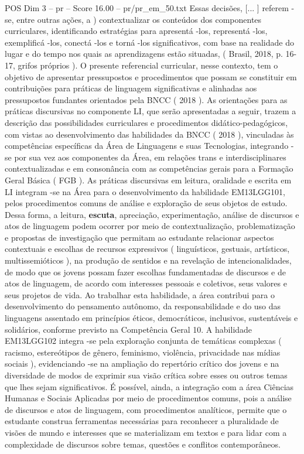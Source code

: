\begin{textsample}{POS Dim 3 – pr – Score 16.00 – pr/pr\_em\_50.txt}
Essas decisões, [... ] referem -se, entre outras ações, a ) contextualizar os conteúdos dos componentes curriculares, identificando estratégias para apresentá -los, representá -los, exemplificá -los, conectá -los e torná -los significativos, com base na realidade do lugar e do tempo nos quais as aprendizagens estão situadas, ( Brasil, 2018, p. 16-17, grifos próprios ).
O presente referencial curricular, nesse contexto, tem o objetivo de apresentar pressupostos e procedimentos que possam se constituir em contribuições para práticas de linguagem significativas e alinhadas aos pressupostos fundantes orientados pela BNCC ( 2018 ).
As orientações para as práticas discursivas no componente LI, que serão apresentadas a seguir, trazem a descrição das possibilidades curriculares e procedimentos didático-pedagógicos, com vistas ao desenvolvimento das habilidades da BNCC ( 2018 ), vinculadas às competências específicas da Área de Linguagens e suas Tecnologias, integrando -se por sua vez aos componentes da Área, em relações trans e interdisciplinares contextualizadas e em consonância com as competências gerais para a Formação Geral Básica ( FGB ).
As práticas discursivas em leitura, oralidade e escrita em LI integram -se na Área para o desenvolvimento da habilidade EM13LGG101, pelos procedimentos comuns de análise e exploração de seus objetos de estudo.
Dessa forma, a leitura, \textbf{escuta}, apreciação, experimentação, análise de discursos e atos de linguagem podem ocorrer por meio de contextualização, problematização e propostas de investigação que permitam ao estudante relacionar aspectos contextuais e escolhas de recursos expressivos ( linguísticos, gestuais, artísticos, multissemióticos ), na produção de sentidos e na revelação de intencionalidades, de modo que os jovens possam fazer escolhas fundamentadas de discursos e de atos de linguagem, de acordo com interesses pessoais e coletivos, seus valores e seus projetos de vida.
Ao trabalhar esta habilidade, a área contribui para o desenvolvimento do pensamento autônomo, da responsabilidade e do uso das linguagens assentado em princípios éticos, democráticos, inclusivos, sustentáveis e solidários, conforme previsto na Competência Geral 10.
A habilidade EM13LGG102 integra -se pela exploração conjunta de temáticas complexas ( racismo, estereótipos de gênero, feminismo, violência, privacidade nas mídias sociais ), evidenciando -se na ampliação do repertório crítico dos jovens e na diversidade de modos de exprimir sua visão crítica sobre esses ou outros temas que lhes sejam significativos.
É possível, ainda, a integração com a área Ciências Humanas e Sociais Aplicadas por meio de procedimentos comuns, pois a análise de discursos e atos de linguagem, com procedimentos analíticos, permite que o estudante construa ferramentas necessárias para reconhecer a pluralidade de visões de mundo e interesses que se materializam em textos e para lidar com a complexidade de discursos sobre temas, questões e conflitos contemporâneos.

\end{textsample}
